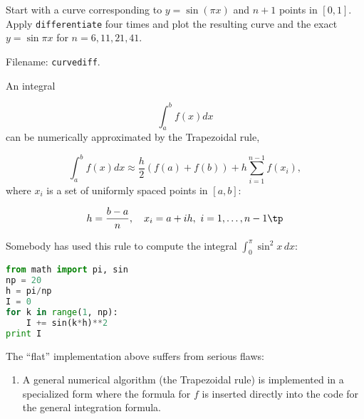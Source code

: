 \documentclass[graybox,sectrefs,envcountresetchap,open=right,final]{svmonodo}
\makeatletter
\newenvironment{doconceexercise}{}{}
\newcounter{doconceexercisecounter}%
\newcommand\listofexercises{
\chapter*{List of Exercises, Problems, and Projects
          \@mkboth{List of Exercises, Problems, and Projects}{List of Exercises, Problems, and Projects}}
\markboth{List of Exercises, Problems, and Projects}{List of Exercises, Problems, and Projects}
\@starttoc{loe}
}
\makeatother
\begin{document}
\begin{doconceexercise}
\noindent

Start with a curve corresponding to $y=\sin(\pi x)$ and $n+1$
points in $[0,1]$. Apply \texttt{differentiate} four times and plot the
resulting curve and the exact $y=\sin\pi x$ for $n=6, 11, 21, 41$.



\noindent Filename: \texttt{curvediff}.

\end{doconceexercise}

\begin{doconceexercise}

                
\label{softeng1:exer:integral:flat}

An integral

\[ \int_a^b f(x)dx \]
can be numerically approximated by the Trapezoidal rule,

\[ \int_a^b f(x)dx \approx \frac{h}{2}(f(a) + f(b)) + h\sum_{i=1}^{n-1} f(x_i),
\]
where $x_i$ is a set of uniformly spaced points in $[a,b]$:

\[ h = \frac{b-a}{n},\quad x_i=a + ih,\ i=1,\ldots,n-1\tp \]

Somebody has used this rule to compute the integral $\int_0^\pi \sin^2x\, dx$:









\begin{lstlisting}[language=python,style=blue1bar_bluegreen]
from math import pi, sin
np = 20
h = pi/np
I = 0
for k in range(1, np):
    I += sin(k*h)**2
print I

\end{lstlisting}


The ``flat'' implementation above suffers from serious flaws:

\begin{enumerate}
\item A general numerical algorithm (the Trapezoidal rule) is implemented in a specialized form where the formula for $f$ is inserted directly into the code for the general integration formula.


\end{enumerate}
\end{doconceexercise}
\end{document}
